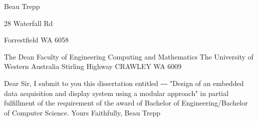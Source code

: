 
\begin{dedication} %


\begin{flushright}
 

Beau Trepp 

28 Waterfall Rd

Forrestfield WA 6058 
\end{flushright}

\begin{flushleft}
The Dean
Faculty of Engineering Computing and Mathematics \newline
The University of Western Australia  Stirling Highway \newline
CRAWLEY WA 6009 
\end{flushleft}

\begin{flushleft}
Dear Sir, \newline
  \newline
I submit to you this dissertation entitled ― "Design of an embedded data acquisition and display system using a modular approach" in partial fulfillment of the requirement of the award of Bachelor of Engineering/Bachelor of Computer Science.
 \newline \newline \newline
Yours Faithfully, \newline
\newline \newline
Beau Trepp 
\end{flushleft}
\end{dedication}


